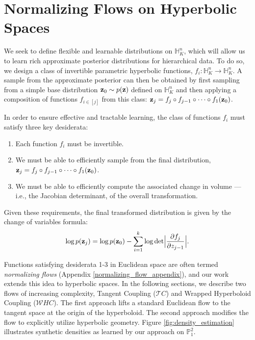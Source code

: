 \section{Normalizing Flows on Hyperbolic Spaces}
We seek to define flexible and learnable distributions on $\mathbb{H}^n_K$, which will allow us to learn rich approximate posterior distributions for hierarchical data.
To do so, we design a class of invertible parametric hyperbolic functions, $f_i: \mathbb{H}^n_K \to \mathbb{H}^n_K$.
A sample from the approximate posterior can then be obtained by first sampling from a simple base distribution $\mathbf{z}_0 \sim p(\mathbf{z})$ defined on $\mathbb{H}^n_K$ and then applying a composition of  functions $f_{i\in[j]}$ from this class: $\mathbf{z}_j = f_j \circ f_{j-1} \circ \dots \circ f_1(\mathbf{z}_0)$.

In order to ensure effective and tractable learning, the class of functions $f_i$ must satisfy three key desiderata:
\begin{enumerate}[itemsep=0pt, parsep=0pt, topsep=0pt]
    \item Each function $f_i$ must be invertible. 
    \item We must be able to efficiently sample from the final distribution, $\mathbf{z}_j = f_j \circ f_{j-1} \circ \dots \circ f_1(\mathbf{z}_0)$. 
    \item We must be able to efficiently compute the associated change in volume ---i.e., the Jacobian determinant, of the overall transformation.
\end{enumerate}
 Given these requirements, the final transformed distribution is given by the change of variables formula:
\begin{equation}
    \log p(\mb{z}_j) = \log p(\mb{z}_0) - \sum_{i=1}^k\log \textnormal{det}\Big|\frac{\partial f_j}{\partial z_{j-1}} \Big|.
    \vspace{-5pt}
\end{equation}

Functions satisfying desiderata 1-3 in Euclidean space are often termed {\em normalizing flows} (Appendix \ref{normalizing_flow_appendix}), and our work extends this idea to hyperbolic spaces. In the following sections, we describe two flows of increasing complexity, Tangent Coupling ($\mathcal{T}C$) and Wrapped Hyperboloid Coupling ($\mathcal{W}HC$). The first approach lifts a standard Euclidean flow to the tangent space at the origin of the hyperboloid.
The second approach modifies the flow to explicitly utilize hyperbolic geometry. Figure \ref{fig:density_estimation} illustrates synthetic densities as learned by our approach on $\mathbb{P}^2_1$. 

